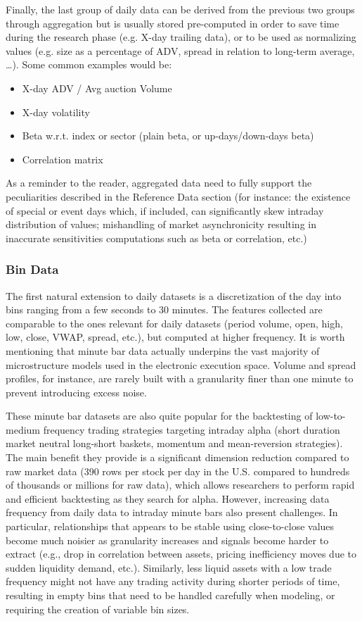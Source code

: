 Finally, the last group of daily data can be derived from the previous two groups through aggregation but is usually stored pre-computed in order to save time during the research phase (e.g. X-day trailing data), or to be used as normalizing values (e.g. size as a percentage of ADV, spread in relation to long-term average, \dots). Some common examples would be:
        \begin{itemize}
        \item X-day ADV / Avg auction Volume
        \item X-day volatility
        \item Beta w.r.t. index or sector (plain beta, or up-days/down-days beta)
        \item Correlation matrix
        \end{itemize}
As a reminder to the reader, aggregated data need to fully support the peculiarities described in the Reference Data section (for instance: the existence of special or event days which, if included, can significantly skew intraday distribution of values; mishandling of market asynchronicity resulting in inaccurate sensitivities computations such as beta or correlation, etc.)


\subsubsection{Bin Data}


The first natural extension to daily datasets is a discretization of the day into bins ranging from a few seconds to 30 minutes. The features collected are comparable to the ones relevant for daily datasets (period volume, open, high, low, close, VWAP, spread, etc.), but computed at higher frequency. It is worth mentioning that minute bar data actually underpins the vast majority of microstructure models used in the electronic execution space. Volume and spread profiles, for instance, are rarely built with a granularity finer than one minute to prevent introducing excess noise.

These minute bar datasets are also quite popular for the backtesting of low-to-medium frequency trading strategies targeting intraday alpha (short duration market neutral long-short baskets, momentum and mean-reversion strategies). The main benefit they provide is a significant dimension reduction compared to raw market data (390 rows per stock per day in the U.S. compared to hundreds of thousands or millions for raw data), which allows researchers to perform rapid and efficient backtesting as they search for alpha. However, increasing data frequency from daily data to intraday minute bars also present challenges. In particular, relationships that appears to be stable using close-to-close values become much noisier as granularity increases and signals become harder to extract (e.g., drop in correlation between assets, pricing inefficiency moves due to sudden liquidity demand, etc.). Similarly, less liquid assets with a low trade frequency might not have any trading activity during shorter periods of time, resulting in empty bins that need to be handled carefully when modeling, or requiring the creation of variable bin sizes.


